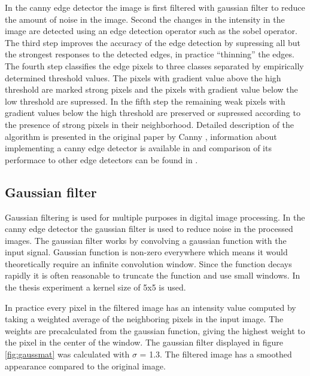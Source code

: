 In the canny edge detector the image is first filtered with gaussian filter to
reduce the amount of noise in the image. Second the changes in the intensity in
the image are detected using an edge detection operator such as the sobel
operator. The third step improves the accuracy of the edge detection by
supressing all but the strongest responses to the detected edges, in practice
``thinning'' the edges. The fourth step classifies the edge pixels to three
classes separated by empirically determined threshold values. The pixels with
gradient value above the high threshold are marked strong pixels and the pixels
with gradient value below the low threshold are supressed. In the fifth step the
remaining weak pixels with gradient values below the high threshold are
preserved or supressed according to the presence of strong pixels in their
neighborhood. Detailed description of the algorithm is presented in the original
paper by Canny \cite{canny1986computational}, information about implementing a
canny edge detector is available in \cite{gonzalez2008digital} and comparison of
its performace to other edge detectors can be found in \cite{maini2009study}.

\subsection{Gaussian filter}
\label{subsec:gauss}
Gaussian filtering is used for multiple purposes in digital image processing.
In the canny edge detector the gaussian filter is used to reduce noise in the
processed images. The gaussian filter works by convolving a gaussian function
with the input signal. Gaussian function is non-zero everywhere which means it
would theoretically require an infinite convolution window. Since the function
decays rapidly it is often reasonable to truncate the function and use small
windows. \cite{gonzalez2008digital} In the thesis experiment a kernel size of
5x5 is used.

In practice every pixel in the filtered image has an intensity value computed
by taking a weighted average of the neighboring pixels in the input image. The
weights are precalculated from the gaussian function, giving the highest weight
to the pixel in the center of the window. The gaussian filter displayed in
figure \ref{fig:gaussmat} was calculated with $\sigma$ = 1.3. The filtered
image has a smoothed appearance compared to the original image. 

